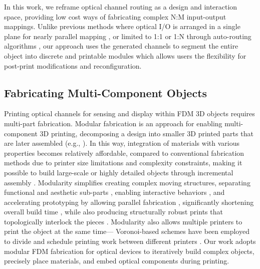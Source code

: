 In this work, we reframe optical channel routing as a design and interaction space, providing low cost ways of fabricating complex N:M input-output mappings.
Unlike previous methods where optical I/O is arranged in a single plane for nearly parallel mapping \cite{printed_optics_2012}, or limited to 1:1 or 1:N through auto-routing algorithms \cite{series_of_tubes_2014}, our approach uses the generated channels to segment the entire object into discrete and printable modules which allows users the flexibility for post-print modifications and reconfiguration. %


\subsection{Fabricating Multi-Component Objects}
Printing optical channels for sensing and display within FDM 3D objects requires multi-part fabrication. 
Modular fabrication is an approach for enabling multi-component 3D printing,
decomposing a design into smaller 3D printed parts that are later assembled (e.g., \cite{series_of_tubes_2014}). 
In this way, integration of materials with various properties becomes relatively affordable,
compared to 
conventional fabrication methods due to %
printer size limitations and complexity constraints, making it possible to build large-scale or highly detailed objects through incremental assembly \cite{sun2021flextruss, huang20233d,moya2024single}. 
Modularity simplifies creating complex moving structures, separating functional and aesthetic sub-parts \cite{faruqi2023style2fab}, enabling interactive behaviors \cite{chen2021pneuseries}, %
and accelerating prototyping by allowing parallel fabrication \cite{yildiz2024modular}, %
significantly shortening overall build time \cite{nisser2021laserfactory, noodleprint2025}, while also producing structurally robust prints that topologically interlock the pieces \cite{voronoodle2022}. Modularity also allows multiple printers to print the object at the same time--- Voronoi-based schemes have been employed to divide and schedule printing work between different printers \cite{safezone2024, safezonestar2025}. Our work adopts modular FDM fabrication for optical devices to iteratively build complex objects, precisely place materials, and embed optical components during printing.


